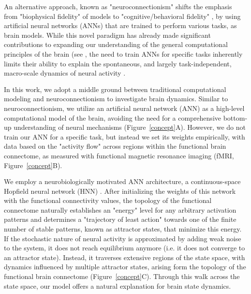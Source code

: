 \documentclass{article}
\begin{document}
An alternative approach, known as "neuroconnectionism" \citep{doerig2023neuroconnectionist} shifts the
emphasis from "biophysical fidelity" of models to "cognitive/behavioral fidelity"
\citep{kriegeskorte2018cognitive}, by using artificial neural networks (ANNs) that are trained to
perform various tasks, as brain models.
While this novel paradigm has already made significant contributions to expanding our understanding of the general
computational principles of the brain (see \citep{doerig2023neuroconnectionist}, the need to train ANNs for
specific tasks inherently limits their ability to explain the spontaneous, and largely task-independent, macro-scale
dynamics of neural activity \citep{richards2019deep}.

In this work, we adopt a middle ground between traditional computational modeling and neuroconnectionism to investigate brain dynamics.
Similar to neuroconnectionism, we utilize an artificial neural network (ANN) as a high-level computational model of the brain, avoiding the need for a comprehensive bottom-up understanding of neural mechanisms (Figure~\ref{concept}A).
However, we do not train our ANN for a specific task, but instead we set its weights empirically, with data based
on the "activity flow" \citep{cole2016activity, ito2017cognitive}
across regions within the functional brain connectome, as measured with functional magnetic resonance imaging
(fMRI, Figure~\ref{concept}B).

We employ a neurobiologically motivated ANN architecture, a continuous-space Hopfield neural network (HNN) \citep{hopfield1982neural, krotov2023new}.
After initializing the weights of this network with the functional connectivity values, the topology of the functional connectome naturally establishes an "energy" level for any arbitrary activation patterns and determines a "trajectory of least action" towards one of the finite number of stable patterns, known as attractor states, that minimize this energy.
If the stochastic nature of neural activity is approximated by adding weak noise to the system, it does not reach equilibrium anymore (i.e. it does not converge to an attractor state).
Instead, it traverses extensive regions of the state space, with dynamics influenced by multiple attractor states, arising form the topology of the functional brain connectome (Figure~\ref{concept}C). Through this walk across the state space, our model offers a natural explanation for brain state dynamics.
\end{document}
